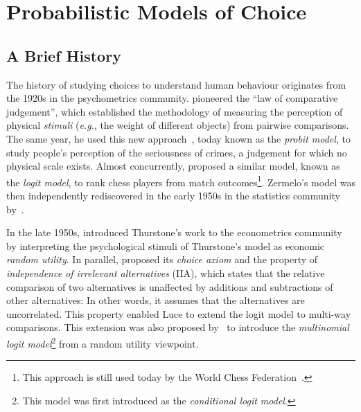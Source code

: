 \section{Probabilistic Models of Choice}
\label{in:sec:models}

\subsection{A Brief History}

The history of studying choices to understand human behaviour originates from the 1920s in the psychometrics community.
\citet{thurstone1927law} pioneered the ``law of comparative judgement'', which established the methodology of measuring the perception of physical \emph{stimuli} (\textit{e.g.}, the weight of different objects) from pairwise comparisons.
The same year, he used this new approach~\citep{thurstone1927method}, today known as the \emph{probit model}, to study people's perception of the seriousness of crimes, a judgement for which no physical scale exists.
Almost concurrently, \citet{zermelo1928berechnung} proposed a similar model, known as the \emph{logit model}, to rank chess players from match outcomes\footnote{This approach is still used today by the World Chess Federation~\citep{elo1978rating}.}.
Zermelo's model was then independently rediscovered in the early 1950s in the statistics community by~\citet{bradley1952rank}.

In the late 1950s, \citet{marschak1959binary} introduced Thurstone's work to the econometrics community by interpreting the psychological stimuli of Thurstone's model as economic \emph{random utility}.
In parallel, \citet{luce1959individual} proposed its \emph{choice axiom} and the property of \emph{independence of irrelevant alternatives} (IIA), which states that the relative comparison of two alternatives is unaffected by additions and subtractions of other alternatives:
In other words, it assumes that the alternatives are uncorrelated.
This property enabled Luce to extend the logit model to multi-way comparisons.
This extension was also proposed by~\citet{mcfadden1973conditional} to introduce the \emph{multinomial logit model}\footnote{This model was first introduced as the \emph{conditional logit model}.} from a random utility viewpoint.

